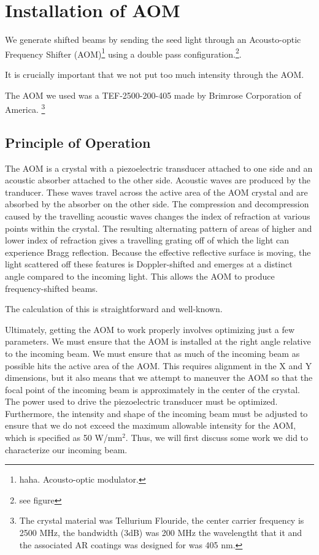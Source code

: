 \chapter{Installation of AOM}

We generate shifted beams by sending the seed light through an Acousto-optic Frequency Shifter (AOM)\footnote{haha. Acousto-optic modulator.} using a double pass configuration.\footnote{see figure}. 


It is crucially important that we not put too much intensity through the AOM. 

The AOM we used was a TEF-2500-200-405 made by Brimrose Corporation of America. \footnote{The crystal material was Tellurium Flouride, the center carrier frequency is 2500 MHz, the bandwidth (3dB) was 200 MHz the wavelengtht that it and the associated AR coatings was designed for was 405 nm.} 

\section{Principle of Operation}

The AOM is a crystal with a piezoelectric transducer attached to one side and an acoustic absorber attached to the other side. Acoustic waves are produced by the tranducer. These waves travel across the active area of the AOM crystal and are absorbed by the absorber on the other side. The compression and decompression caused by the travelling acoustic waves changes the index of refraction at various points within the crystal. The resulting alternating pattern of areas of higher and lower index of refraction gives a travelling grating off of which the light can experience Bragg reflection. Because the effective reflective surface is moving, the light scattered off these features is Doppler-shifted and emerges at a distinct angle compared to the incoming light. This allows the AOM to produce frequency-shifted beams. 

The calculation of this is straightforward and well-known. 


Ultimately, getting the AOM to work properly involves optimizing just a few parameters. We must ensure that the AOM is installed at the right angle relative to the incoming beam. We must ensure that as much of the incoming beam as possible hits the active area of the AOM. This requires alignment in the X and Y dimensions, but it also means that we attempt to maneuver the AOM so that the focal point of the incoming beam is approximately in the center of the crystal. The power used to drive the piezoelectric transducer must be optimized. Furthermore, the intensity and shape of the incoming beam must be adjusted to ensure that we do not exceed the maximum allowable intensity for the AOM, which is specified as 50 W/mm$^2$.
Thus, we will first discuss some work we did to characterize our incoming beam.

